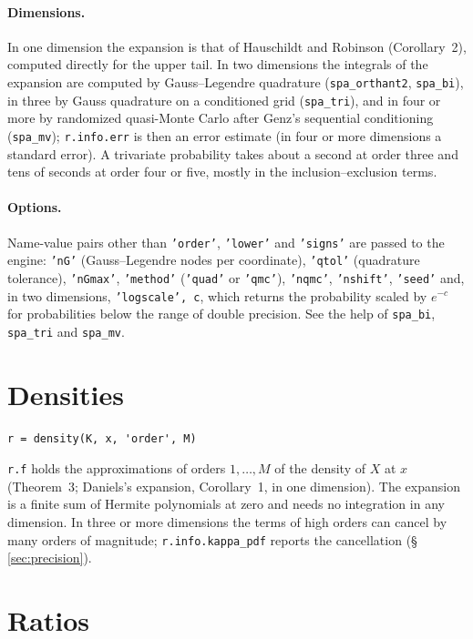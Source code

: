 \documentclass[11pt]{article}
\newcommand{\prog}[1]{\texttt{#1}}
\begin{document}
\paragraph{Dimensions.} In one dimension the expansion is that of Hauschildt and Robinson
(Corollary~2), computed directly for the upper tail. In two dimensions the integrals of the
expansion are computed by Gauss--Legendre quadrature (\prog{spa\_orthant2}, \prog{spa\_bi}), in
three by Gauss quadrature on a conditioned grid (\prog{spa\_tri}), and in four or more by randomized
quasi-Monte Carlo after Genz's sequential conditioning (\prog{spa\_mv}); \prog{r.info.err} is then an
error estimate (in four or more dimensions a standard error). A trivariate probability takes about
a second at order three and tens of seconds at order four or five, mostly in the inclusion--exclusion
terms.

\paragraph{Options.} Name-value pairs other than \prog{'order'}, \prog{'lower'} and \prog{'signs'}
are passed to the engine: \prog{'nG'} (Gauss--Legendre nodes per coordinate), \prog{'qtol'}
(quadrature tolerance), \prog{'nGmax'}, \prog{'method'} (\prog{'quad'} or \prog{'qmc'}),
\prog{'nqmc'}, \prog{'nshift'}, \prog{'seed'} and, in two dimensions, \prog{'logscale', c}, which
returns the probability scaled by $e^{-c}$ for probabilities below the range of double precision.
See the help of \prog{spa\_bi}, \prog{spa\_tri} and \prog{spa\_mv}.

\section{Densities}\label{sec:density}

\begin{lstlisting}
r = density(K, x, 'order', M)
\end{lstlisting}
\prog{r.f} holds the approximations of orders $1,\ldots,M$ of the density of $X$ at $x$
(Theorem~3; Daniels's expansion, Corollary~1, in one dimension). The expansion is a finite sum of
Hermite polynomials at zero and needs no integration in any dimension. In three or more dimensions
the terms of high orders can cancel by many orders of magnitude; \prog{r.info.kappa\_pdf} reports
the cancellation (\S\,\ref{sec:precision}).

\section{Ratios}\label{sec:ratios}
\end{document}

